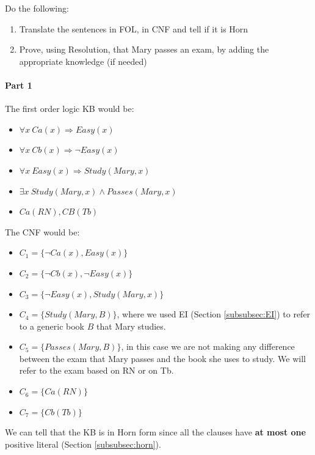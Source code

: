 \documentclass[10pt,a4paper]{article}
\begin{document}
Do the following:
\begin{enumerate}
\item Translate the sentences in FOL, in CNF and tell if it is Horn 
\item  Prove, using Resolution, that Mary passes an exam, by adding the appropriate knowledge (if needed)
\end{enumerate}


\paragraph{Part 1}
The first order logic KB would be:
\begin{itemize}
\item $\forall x\ Ca(x)  \Rightarrow Easy(x)$
\item $\forall x\ Cb(x) \Rightarrow \neg Easy(x)$
\item $\forall x\  Easy(x) \Rightarrow Study(Mary,x)$
\item $\exists x\ Study(Mary,x) \wedge Passes(Mary,x)$
\item $Ca(RN), CB(Tb)$
\end{itemize}

The CNF would be:
\begin{itemize}
\item $C_1= \lbrace \neg Ca(x), Easy(x) \rbrace$
\item $C_2= \lbrace \neg Cb(x), \neg Easy(x) \rbrace$
\item $C_3= \lbrace \neg Easy(x), Study(Mary,x) \rbrace$
\item $C_4= \lbrace Study(Mary,B) \rbrace$, where we used EI (Section \ref{subsubsec:EI}) to refer to a generic book $B$ that Mary studies.
\item $C_5= \lbrace Passes(Mary,B) \rbrace$, in this case we are not making any difference between the exam that Mary passes and the book she uses to study. We will refer to the exam based on RN or on Tb.
\item $C_6= \lbrace Ca(RN) \rbrace$
\item $C_7= \lbrace Cb(Tb) \rbrace$
\end{itemize}
We can tell that the KB is in Horn form since all the clauses have \textbf{at most one} positive literal (Section \ref{subsubsec:horn}).
\end{document}
